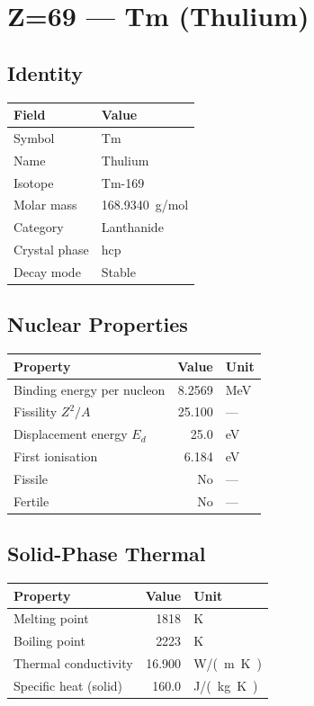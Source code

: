 \documentclass[11pt,a4paper]{article}
\begin{document}
\newpage

\section{Z=69 --- Tm (Thulium)}
\label{sec:Z69}

\subsection{Identity}
\begin{tabular}{ll}
  \toprule
  Field & Value \\
  \midrule
  Symbol & Tm \\
  Name & Thulium \\
  Isotope & Tm-169 \\
  Molar mass & \SI{168.9340}{g/mol} \\
  Category & Lanthanide \\
  Crystal phase & hcp \\
  Decay mode & Stable \\
  \bottomrule
\end{tabular}

\subsection{Nuclear Properties}
\begin{tabular}{lrl}
  \toprule
  Property & Value & Unit \\
  \midrule
  Binding energy per nucleon & 8.2569 & \si{MeV} \\
  Fissility $Z^2/A$ & 25.100 & --- \\
  Displacement energy $E_d$ & 25.0 & \si{eV} \\
  First ionisation & 6.184 & \si{eV} \\
  Fissile & No & --- \\
  Fertile & No & --- \\
  \bottomrule
\end{tabular}

\subsection{Solid-Phase Thermal}
\begin{tabular}{lrl}
  \toprule
  Property & Value & Unit \\
  \midrule
  Melting point & 1818 & \si{K} \\
  Boiling point & 2223 & \si{K} \\
  Thermal conductivity & 16.900 & \si{W/(m.K)} \\
  Specific heat (solid) & 160.0 & \si{J/(kg.K)} \\
  \bottomrule
\end{tabular}
\end{document}
